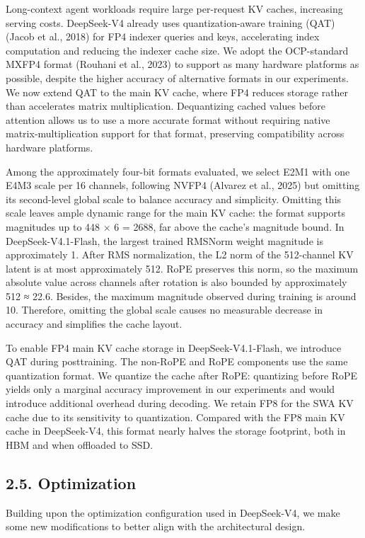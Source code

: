 \documentclass[
  10
]{article}
\begin{document}
Long-context agent workloads require large per-request KV caches,
increasing serving costs. DeepSeek-V4 already uses quantization-aware
training (QAT) (Jacob et al., 2018) for FP4 indexer queries and keys,
accelerating index computation and reducing the indexer cache size. We
adopt the OCP-standard MXFP4 format (Rouhani et al., 2023) to support as
many hardware platforms as possible, despite the higher accuracy of
alternative formats in our experiments. We now extend QAT to the main KV
cache, where FP4 reduces storage rather than accelerates matrix
multiplication. Dequantizing cached values before attention allows us to
use a more accurate format without requiring native
matrix-multiplication support for that format, preserving compatibility
across hardware platforms.

Among the approximately four-bit formats evaluated, we select E2M1 with
one E4M3 scale per 16 channels, following NVFP4 (Alvarez et al., 2025)
but omitting its second-level global scale to balance accuracy and
simplicity. Omitting this scale leaves ample dynamic range for the main
KV cache: the format supports magnitudes up to 448 × 6 = 2688, far above
the cache's magnitude bound. In DeepSeek-V4.1-Flash, the largest trained
RMSNorm weight magnitude is approximately 1. After RMS normalization,
the L2 norm of the 512-channel KV latent is at most approximately 512.
RoPE preserves this norm, so the maximum absolute value across channels
after rotation is also bounded by approximately 512 ≈ 22.6. Besides, the
maximum magnitude observed during training is around 10. Therefore,
omitting the global scale causes no measurable decrease in accuracy and
simplifies the cache layout.

To enable FP4 main KV cache storage in DeepSeek-V4.1-Flash, we introduce
QAT during posttraining. The non-RoPE and RoPE components use the same
quantization format. We quantize the cache after RoPE: quantizing before
RoPE yields only a marginal accuracy improvement in our experiments and
would introduce additional overhead during decoding. We retain FP8 for
the SWA KV cache due to its sensitivity to quantization. Compared with
the FP8 main KV cache in DeepSeek-V4, this format nearly halves the
storage footprint, both in HBM and when offloaded to SSD.

\subsection{2.5. Optimization}\label{optimization}

Building upon the optimization configuration used in DeepSeek-V4, we
make some new modifications to better align with the architectural
design.
\end{document}
